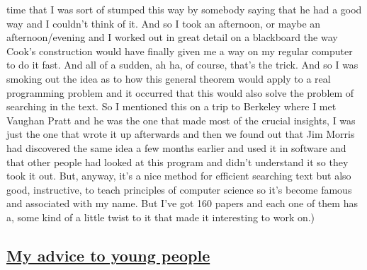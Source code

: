 \documentclass[]{article}
\begin{document}
time that I was sort of stumped this way by somebody saying that he had
a good way and I couldn't think of it. And so I took an afternoon, or
maybe an afternoon/evening and I worked out in great detail on a
blackboard the way Cook's construction would have finally given me a way
on my regular computer to do it fast. And all of a sudden, ah ha, of
course, that's the trick. And so I was smoking out the idea as to how
this general theorem would apply to a real programming problem and it
occurred that this would also solve the problem of searching in the
text. So I mentioned this on a trip to Berkeley where I met Vaughan
Pratt and he was the one that made most of the crucial insights, I was
just the one that wrote it up afterwards and then we found out that Jim
Morris had discovered the same idea a few months earlier and used it in
software and that other people had looked at this program and didn't
understand it so they took it out. But, anyway, it's a nice method for
efficient searching text but also good, instructive, to teach principles
of computer science so it's become famous and associated with my name.
But I've got 160 papers and each one of them has a, some kind of a
little twist to it that made it interesting to work on.)

\subsection{\texorpdfstring{\href{http://webofstories.com/play/17152}{My
advice to young
people}}{My advice to young people}}\label{my-advice-to-young-people}
\end{document}
